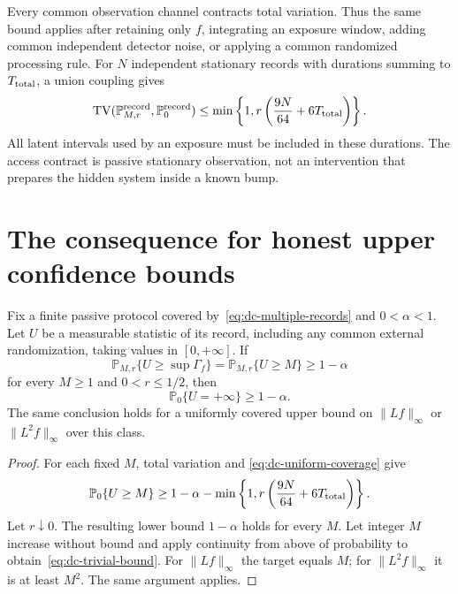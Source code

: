 Every common observation channel contracts total variation. Thus the same
bound applies after retaining only $f$, integrating an exposure window,
adding common independent detector noise, or applying a common randomized
processing rule. For $N$ independent stationary records with durations
summing to $T_{\rm total}$, a union coupling gives
\begin{equation}
 \operatorname{TV}(\mathbb P_{M,r}^{\rm record},\mathbb P_0^{\rm record})
 \leq\min\left\{1,r\left(\frac{9N}{64}+6T_{\rm total}\right)\right\}.
 \label{eq:dc-multiple-records}
\end{equation}
All latent intervals used by an exposure must be included in these
durations. The access contract is passive stationary observation, not an
intervention that prepares the hidden system inside a known bump.

\section{The consequence for honest upper confidence bounds}

\begin{theorem}
\label{thm:dc-upper-confidence}
Fix a finite passive protocol covered by~\eqref{eq:dc-multiple-records}
and $0<\alpha<1$. Let $U$ be a measurable statistic of its record, including
any common external randomization, taking values in $[0,+\infty]$.
If
\begin{equation}
 \mathbb P_{M,r}\{U\geq\sup\Gamma_f\}
 =\mathbb P_{M,r}\{U\geq M\}\geq1-\alpha
 \label{eq:dc-uniform-coverage}
\end{equation}
for every $M\geq1$ and $0<r\leq1/2$, then
\begin{equation}
 \mathbb P_0\{U=+\infty\}\geq1-\alpha.
 \label{eq:dc-trivial-bound}
\end{equation}
The same conclusion holds for a uniformly covered upper bound on
$\|Lf\|_\infty$ or $\|L^2f\|_\infty$ over this class.
\end{theorem}

\begin{proof}
For each fixed $M$, total variation and
\eqref{eq:dc-uniform-coverage} give
\[
 \mathbb P_0\{U\geq M\}\geq1-\alpha
 -\min\left\{1,r\left(\frac{9N}{64}+6T_{\rm total}\right)\right\}.
\]
Let $r\downarrow0$. The resulting lower bound $1-\alpha$ holds for every
$M$. Let integer $M$ increase without bound and apply continuity from above
of probability to obtain~\eqref{eq:dc-trivial-bound}.
For $\|Lf\|_\infty$ the target equals $M$; for $\|L^2f\|_\infty$ it is
at least $M^2$. The same argument applies.
\end{proof}

